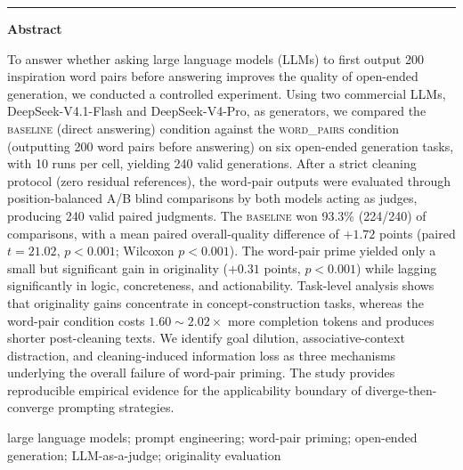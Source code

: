 \documentclass[11pt,a4paper]{article}
\begin{document}
\noindent\rule{\textwidth}{0.75pt}
\vspace{1.0em}

\begin{center}
{\bfseries Abstract}
\end{center}
\noindent
To answer whether asking large language models (LLMs) to first output 200 inspiration word pairs before answering improves the quality of open-ended generation, we conducted a controlled experiment. Using two commercial LLMs, DeepSeek-V4.1-Flash and DeepSeek-V4-Pro, as generators, we compared the \textsc{baseline} (direct answering) condition against the \textsc{word\_pairs} condition (outputting 200 word pairs before answering) on six open-ended generation tasks, with 10 runs per cell, yielding 240 valid generations. After a strict cleaning protocol (zero residual references), the word-pair outputs were evaluated through position-balanced A/B blind comparisons by both models acting as judges, producing 240 valid paired judgments. The \textsc{baseline} won 93.3\% (224/240) of comparisons, with a mean paired overall-quality difference of $+1.72$ points (paired $t=21.02$, $p<0.001$; Wilcoxon $p<0.001$). The word-pair prime yielded only a small but significant gain in originality ($+0.31$ points, $p<0.001$) while lagging significantly in logic, concreteness, and actionability. Task-level analysis shows that originality gains concentrate in concept-construction tasks, whereas the word-pair condition costs $1.60\sim2.02\times$ more completion tokens and produces shorter post-cleaning texts. We identify goal dilution, associative-context distraction, and cleaning-induced information loss as three mechanisms underlying the overall failure of word-pair priming. The study provides reproducible empirical evidence for the applicability boundary of diverge-then-converge prompting strategies.
\vspace{0.4em}

 large language models; prompt engineering; word-pair priming; open-ended generation; LLM-as-a-judge; originality evaluation

\vspace{1.2em}





\end{document}
